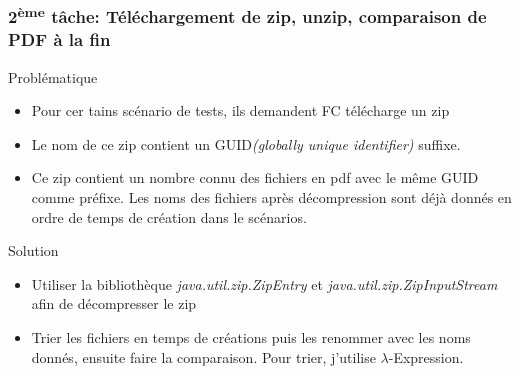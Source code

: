 \documentclass{beamer}
\begin{document}
        \begin{frame}
        \frametitle{2\textsuperscript{ème} tâche: Téléchargement de zip, unzip, comparaison de PDF à la fin}
            \begin{block}{Problématique}
                \begin{itemize}
                    \item Pour cer tains scénario de tests, ils demandent FC télécharge un zip
                    \item Le nom de ce zip contient un GUID\textit{(globally unique identifier)} suffixe. 
                    \item Ce zip contient un nombre connu des fichiers en pdf avec le même GUID comme préfixe. Les noms des fichiers après décompression sont déjà donnés en ordre de temps de création dans le scénarios.
                \end{itemize}
            \end{block}
            \pause
            \begin{block}{Solution}
                \begin{itemize}
                    \item Utiliser la bibliothèque \textit{java.util.zip.ZipEntry} et \textit{java.util.zip.ZipInputStream} afin de décompresser le zip
                    \item Trier les fichiers en temps de créations puis les renommer avec les noms donnés, ensuite faire la comparaison. Pour trier, j'utilise $\lambda$-Expression.
                \end{itemize}
            \end{block}
        \end{frame}
        
\end{document}
